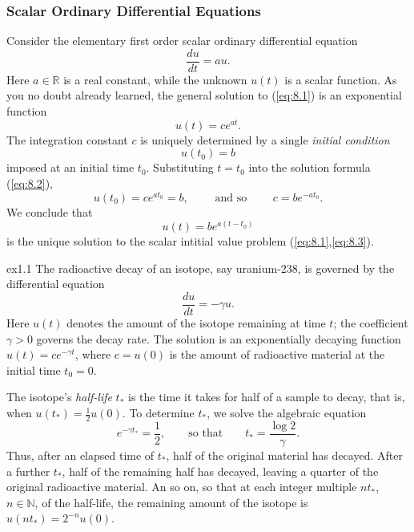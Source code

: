 \documentclass[12pt]{article}
\theoremstyle{remark}
\begin{document}
\subsubsection*{Scalar Ordinary Differential Equations}
Consider the elementary first order scalar ordinary differential equation
\begin{equation}
    \frac{du}{dt} = au.
    \label{eq:8.1}
\end{equation}
Here $a\in\mathbb{R}$ is a real constant, while the unknown $u(t)$ is a scalar function. As you no doubt already learned, the general solution to (\ref{eq:8.1}) is an exponential function 
\begin{equation}
    u(t)=ce^{at}.
    \label{eq:8.2}
\end{equation}
The integration constant $c$ is uniquely determined by a single \emph{initial condition}
\begin{equation}
    u(t_0)=b
    \label{eq:8.3}
\end{equation}
imposed at an initial time $t_0$. Substituting $t=t_0$ into the solution formula (\ref{eq:8.2}), 
\begin{equation*}
    u(t_0)=ce^{at_0}=b,\qquad \text{ and so }\qquad c=be^{-at_0}.
\end{equation*}
We conclude that
\begin{equation}
    u(t)=be^{a(t-t_0)}
    \label{eq:8.4}
\end{equation}
is the unique solution to the scalar intitial value problem (\ref{eq:8.1},\ref{eq:8.3}).


\begin{example}{}{ex1.1}
    The radioactive decay of an isotope, say uranium-238, is governed by the differential equation
    \begin{equation}
        \frac{du}{dt}=-\gamma u.
        \label{eq:8.5}
    \end{equation}
    Here $u(t)$ denotes the amount of the isotope remaining at time $t$; the coefficient $\gamma > 0$ governs the decay rate. The solution is an exponentially decaying function $u(t)=ce^{-\gamma t}$, where $c=u(0)$ is the amount of radioactive material at the initial time $t_0=0$.

    The isotope's \emph{half-life} $t_*$ is the time it takes for half of a sample to decay, that is, when $u(t_*)=\frac{1}{2}u(0)$. To determine $t_*$, we solve the algebraic equation
    \begin{equation}
        e^{-\gamma t_*}=\frac{1}{2},\qquad \text{so that}\qquad t_*=\frac{\log 2}{\gamma}.
        \label{eq:8.6}
    \end{equation}
    Thus, after an elapsed time of $t_*$, half of the original material has decayed. After a further $t_*$, half of the remaining half has decayed, leaving a quarter of the original radioactive material. An so on, so that at each integer multiple $nt_*$, $n\in\mathbb{N}$, of the half-life, the remaining amount of the isotope is $u(nt_*)=2^{-n}u(0)$.
\end{example}
\end{document}
